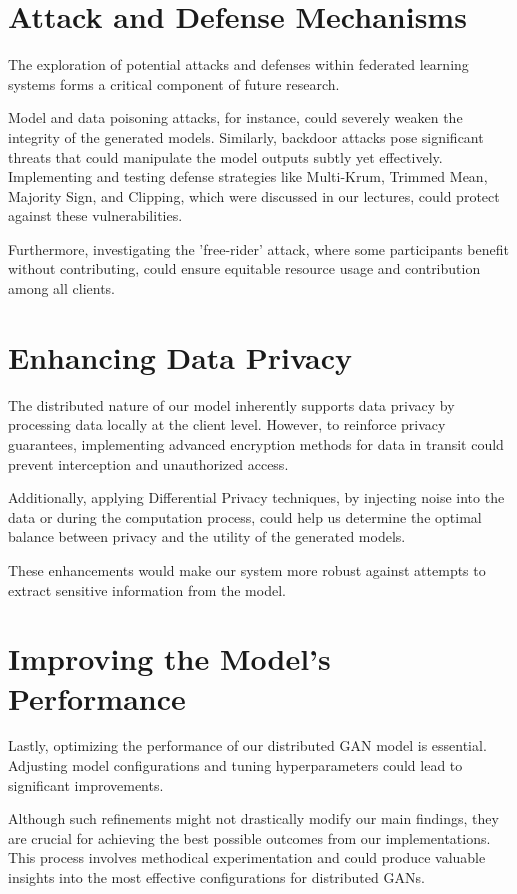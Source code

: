 \section{Attack and Defense Mechanisms}
The exploration of potential attacks and defenses within federated learning systems forms a critical component of future research.

Model and data poisoning attacks, for instance, could severely weaken the integrity of the generated models. Similarly, backdoor attacks pose significant threats that could manipulate the model outputs subtly yet effectively. Implementing and testing defense strategies like Multi-Krum, Trimmed Mean, Majority Sign, and Clipping, which were discussed in our lectures, could protect against these vulnerabilities. 

Furthermore, investigating the 'free-rider' attack, where some participants benefit without contributing, could ensure equitable resource usage and contribution among all clients.


\section{Enhancing Data Privacy}
The distributed nature of our model inherently supports data privacy by processing data locally at the client level. However, to reinforce privacy guarantees, implementing advanced encryption methods for data in transit could prevent interception and unauthorized access. 

Additionally, applying Differential Privacy techniques, by injecting noise into the data or during the computation process, could help us determine the optimal balance between privacy and the utility of the generated models. 

These enhancements would make our system more robust against attempts to extract sensitive information from the model.


\section{Improving the Model's Performance}
Lastly, optimizing the performance of our distributed GAN model is essential. Adjusting model configurations and tuning hyperparameters could lead to significant improvements. 

Although such refinements might not drastically modify our main findings, they are crucial for achieving the best possible outcomes from our implementations. This process involves methodical experimentation and could produce valuable insights into the most effective configurations for distributed GANs.